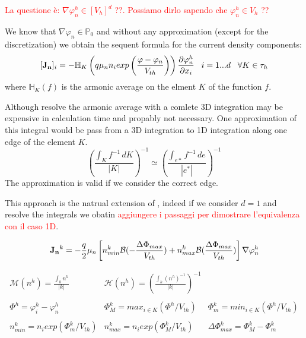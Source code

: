 \textcolor{red}{La questione \`e: $\nabla \varphi_n^h \in \left[ V_h \right]^d$ ??. Possiamo dirlo sapendo che $\varphi_n^h \in V_h$ ??}

We know that $\nabla \varphi_n \in \mathbb{P}_0$ and without any approximation (except for the discretization) we obtain the sequent formula for the current density components:
\begin{equation}
\label{eq: first formula for J}
[\vect{J_n}]_i = - \mathbb{H}_K \left( q \mu_n n_i exp \left( \dfrac{\varphi-\varphi_n}{V_{th}} \right)  \right) \dfrac{\partial \varphi_n^h}{\partial x_i} \psp{5} i = 1...d \psp{5} \forall K \in \tau_h
\end{equation}
where $\mathbb{H}_K(f)$ is the armonic average on the elment $K$ of the function $f$.

Although resolve the armonic average with a comlete 3D integration may be expensive in calculation time and propably not necessary. One approximation of this integral would be pass from a 3D integration to 1D integration along one edge of the element $K$.
\begin{equation}
\label{eq: approzimation from 3D to edge}
\left(\dfrac{\int_K f^{-1} \, dK}{|K|} \right)^{-1} \simeq \left(\dfrac{\int_{e*} f^{-1} \, de}{|e^*|} \right)^{-1}
\end{equation}
  The approximation  is valid if we consider the correct edge.

This approach is the natrual extension of , indeed if we consider $d=1$ and resolve the integrals we obatin \textcolor{red}{aggiungere i passaggi per dimostrare l'equivalenza con il caso 1D}.




\begin{equation}
\mathbf{J_n}^k=-\frac{q}{2}\mu_n
\left[ n_{min}^k\mathcal{B}(-\frac{\Delta \Phi_{max}}{V_{th}})+ n_{max}^k\mathcal{B}(\frac{\Delta \Phi_{max}}{V_{th}})\right]\nabla \varphi_n^h
\end{equation}


\begin{equation*}
\begin{array}{lll}
\mathcal{M}(n^h)=\frac{\int_kn^h}{|k|} &
\mathcal{H}(n^h)=\left(\frac{\int_k(n^h)^{-1}}{|k|} \right) ^{-1} \\ \\
\Phi^h=\varphi_i^h-\varphi_n^h &
\Phi_M^k =  max_{i\in K} (\Phi^h/V_{th}) & \Phi_m^k = min_{i\in K}(\Phi^h/V_{th}) \\ \\ 
n_{min}^k=n_iexp(\Phi_m^k/V_{th}) & 
n_{max}^k=n_iexp(\Phi_M^k/V_{th}) & \Delta \Phi_{max}^k = \Phi_M^k - \Phi_m^k
\end{array}
\end{equation*}

